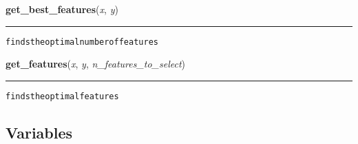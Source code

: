     \label{hal:ml:features:get_best_features}

    \vspace{0.5ex}

\hspace{.8\funcindent}\begin{boxedminipage}{\funcwidth}

    \raggedright \textbf{get\_best\_features}(\textit{x}, \textit{y})

    \vspace{-1.5ex}

    \rule{\textwidth}{0.5\fboxrule}
\setlength{\parskip}{2ex}
\begin{alltt}
finds the optimal number of features 
\end{alltt}

\setlength{\parskip}{1ex}
    \end{boxedminipage}

    \label{hal:ml:features:get_features}

    \vspace{0.5ex}

\hspace{.8\funcindent}\begin{boxedminipage}{\funcwidth}

    \raggedright \textbf{get\_features}(\textit{x}, \textit{y}, \textit{n\_features\_to\_select})

    \vspace{-1.5ex}

    \rule{\textwidth}{0.5\fboxrule}
\setlength{\parskip}{2ex}
\begin{alltt}
finds the optimal features 
\end{alltt}

\setlength{\parskip}{1ex}
    \end{boxedminipage}



  \subsection{Variables}

